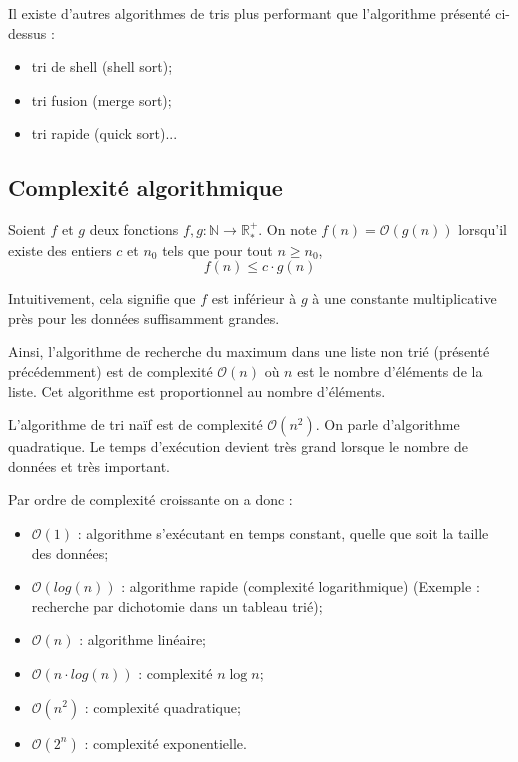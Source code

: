 \documentclass[11pt,oneside]{article}
\begin{document}
\begin{rem}
Il existe d'autres algorithmes de tris plus performant que l'algorithme présenté ci-dessus : 
\begin{itemize}
\item tri de shell (\textsf{shell sort});
\item tri fusion (\textsf{merge sort});
\item tri rapide (\textsf{quick sort})...
\end{itemize}
\end{rem}

\subsection{Complexité algorithmique}
\begin{defi}
\cite{bournez}
Soient $f$ et $g$ deux fonctions $f,g : \mathbb{N} \rightarrow \mathbb{R}^{+}_{*}$. On note $f(n)=\mathcal{O}(g(n))$ lorsqu'il existe des entiers $c$ et $n_0$ tels que pour tout $n\geq n_0$, 
$$
f(n) \leq c\cdot g(n)
$$

Intuitivement, cela signifie que $f$ est inférieur à $g$ à une constante multiplicative près pour les données suffisamment grandes. 

\end{defi}

\begin{exemple}
Ainsi, l'algorithme de recherche du maximum dans une liste non trié (présenté précédemment) est de complexité $\mathcal{O}(n)$ où $n$ est le nombre d'éléments de la liste. Cet algorithme est proportionnel au nombre d'éléments.

L'algorithme de tri naïf est de complexité $\mathcal{O}(n^2)$. On parle d'algorithme quadratique. Le temps d'exécution devient très grand lorsque le nombre de données et très important. 


Par ordre de complexité croissante on a donc :
\begin{itemize}
\item $\mathcal{O}(1)$ : algorithme s'exécutant en temps constant, quelle que soit la taille des données;
\item $\mathcal{O}(log(n))$ : algorithme rapide (complexité logarithmique) (Exemple : recherche par dichotomie dans un tableau trié);
\item $\mathcal{O}(n)$ : algorithme linéaire;
\item $\mathcal{O}(n\cdot log(n))$ : complexité $n \log n$;
\item $\mathcal{O}(n^2)$ : complexité quadratique;
\item $\mathcal{O}(2^n)$ : complexité exponentielle. 
\end{itemize}
\end{exemple}
\end{document}
